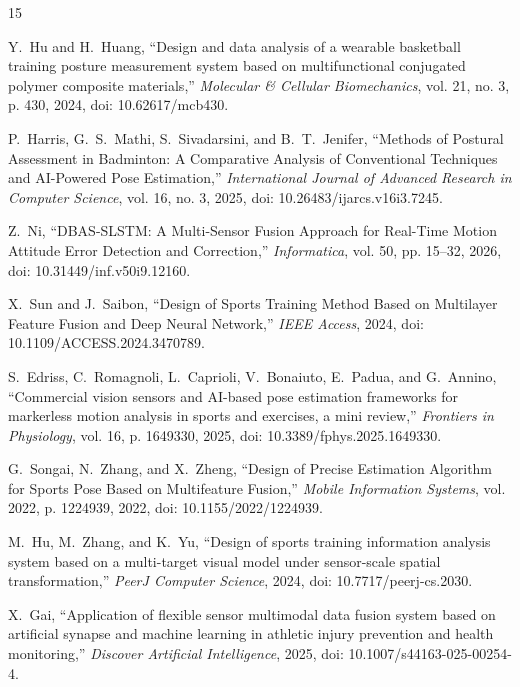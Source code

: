 \documentclass[conference]{IEEEtran}
\begin{document}
\begin{thebibliography}{15}

Y.~Hu and H.~Huang, ``Design and data analysis of a wearable basketball training posture measurement system based on multifunctional conjugated polymer composite materials,'' \emph{Molecular \& Cellular Biomechanics}, vol. 21, no. 3, p. 430, 2024, doi: 10.62617/mcb430.

P.~Harris, G.~S.~Mathi, S.~Sivadarsini, and B.~T.~Jenifer, ``Methods of Postural Assessment in Badminton: A Comparative Analysis of Conventional Techniques and AI-Powered Pose Estimation,'' \emph{International Journal of Advanced Research in Computer Science}, vol. 16, no. 3, 2025, doi: 10.26483/ijarcs.v16i3.7245.

Z.~Ni, ``DBAS-SLSTM: A Multi-Sensor Fusion Approach for Real-Time Motion Attitude Error Detection and Correction,'' \emph{Informatica}, vol. 50, pp. 15--32, 2026, doi: 10.31449/inf.v50i9.12160.

X.~Sun and J.~Saibon, ``Design of Sports Training Method Based on Multilayer Feature Fusion and Deep Neural Network,'' \emph{IEEE Access}, 2024, doi: 10.1109/ACCESS.2024.3470789.

S.~Edriss, C.~Romagnoli, L.~Caprioli, V.~Bonaiuto, E.~Padua, and G.~Annino, ``Commercial vision sensors and AI-based pose estimation frameworks for markerless motion analysis in sports and exercises, a mini review,'' \emph{Frontiers in Physiology}, vol. 16, p. 1649330, 2025, doi: 10.3389/fphys.2025.1649330.

G.~Songai, N.~Zhang, and X.~Zheng, ``Design of Precise Estimation Algorithm for Sports Pose Based on Multifeature Fusion,'' \emph{Mobile Information Systems}, vol. 2022, p. 1224939, 2022, doi: 10.1155/2022/1224939.

M.~Hu, M.~Zhang, and K.~Yu, ``Design of sports training information analysis system based on a multi-target visual model under sensor-scale spatial transformation,'' \emph{PeerJ Computer Science}, 2024, doi: 10.7717/peerj-cs.2030.

X.~Gai, ``Application of flexible sensor multimodal data fusion system based on artificial synapse and machine learning in athletic injury prevention and health monitoring,'' \emph{Discover Artificial Intelligence}, 2025, doi: 10.1007/s44163-025-00254-4.


\end{thebibliography}
\end{document}
